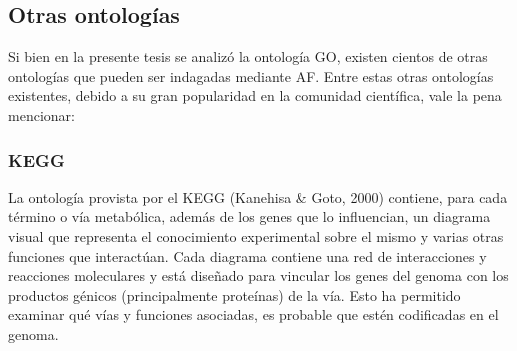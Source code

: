 \documentclass[12pt,twoside]{reedthesis}
\begin{document}
\hypertarget{otras-ontologuxedas}{%
\subsection{Otras ontologías}\label{otras-ontologuxedas}}

Si bien en la presente tesis se analizó la ontología GO, existen cientos de otras ontologías que pueden ser indagadas mediante AF. Entre estas otras ontologías existentes, debido a su gran popularidad en la comunidad científica, vale la pena mencionar:

\hypertarget{kegg}{%
\subsubsection{KEGG}\label{kegg}}

La ontología provista por el KEGG (Kanehisa \& Goto, 2000) contiene, para cada término o vía metabólica, además de los genes que lo influencian, un diagrama visual que representa el conocimiento experimental sobre el mismo y varias otras funciones que interactúan. Cada diagrama contiene una red de interacciones y reacciones moleculares y está diseñado para vincular los genes del genoma con los productos génicos (principalmente proteínas) de la vía. Esto ha permitido examinar qué vías y funciones asociadas, es probable que estén codificadas en el genoma.

\par
\end{document}
